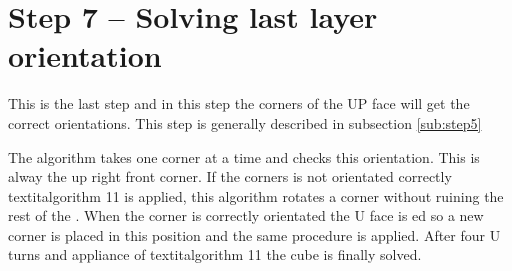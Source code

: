 \section{Step 7 -- Solving last layer orientation}
This is the last step and in this step the corners of the UP face will get the correct orientations.
This step is generally described in subsection \ref{sub:step5}

The algorithm takes one corner at a time and checks this orientation. This is alway the up right front corner. If the corners is not orientated correctly textit{algorithm 11} is applied, this algorithm rotates a corner without ruining the rest of the \cube{}. When the corner is correctly orientated the U face is \twist{}ed so a new corner is placed in this position and the same procedure is applied. After four U turns and appliance of textit{algorithm 11} the cube is finally solved. 



\begin{comment}
In the last layer the corners in the last layer were poisitend correctly but not oreiented. In this step will the coreners be oreinted correctly and as result it will lead to that the \rubiks{} will be solved.

This step is very simple because it there is only four corners to control and either the corner is oriented correctly or is isn't.  

The program vil first control that the front-right-up corner is oriented correctly if not the will use the an algorithm twice and after the program vil control the corner again if the corner is not oriented correctly his time the use teh algorithme and will continue with this until the corner is oriented correctly. 
Then the corner is orented correctly the program will make at up move ("U") and will control the new corner and the program will do this with every corner in the last layer until they are oriented corectly.  

\end{comment}
